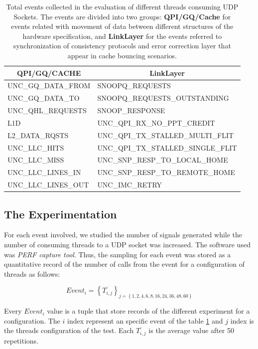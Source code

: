 \documentclass[journal]{IEEEtran}
\begin{document}
\begin{table}[h!]
\centering
\begin{tabular}{l|l}
\multicolumn{1}{c|}{{\bf QPI/GQ/CACHE}} & \multicolumn{1}{c}{{\bf LinkLayer}} \\ \hline
{ UNC\_GQ\_DATA\_FROM} & SNOOPQ\_REQUESTS \\
{ UNC\_GQ\_DATA\_TO} & SNOOPQ\_REQUESTS\_OUTSTANDING \\
{ UNC\_QHL\_REQUESTS} & SNOOP\_RESPONSE \\
{ L1D} & UNC\_QPI\_RX\_NO\_PPT\_CREDIT \\
{ L2\_DATA\_RQSTS} & UNC\_QPI\_TX\_STALLED\_MULTI\_FLIT \\
{ UNC\_LLC\_HITS} & UNC\_QPI\_TX\_STALLED\_SINGLE\_FLIT \\
{ UNC\_LLC\_MISS} & UNC\_SNP\_RESP\_TO\_LOCAL\_HOME \\
{ UNC\_LLC\_LINES\_IN} & UNC\_SNP\_RESP\_TO\_REMOTE\_HOME \\
{ UNC\_LLC\_LINES\_OUT} & UNC\_IMC\_RETRY
\end{tabular}
\caption{Total events collected in the evaluation of different threads consuming UDP Sockets. The events are divided into two groups: \textbf{QPI/GQ/Cache} for events related with movement of data between different structures of the hardware specification, and \textbf{LinkLayer} for the events referred to synchronization of consistency protocols and error correction layer that appear in cache bouncing scenarios.}
\label{table:eventos}
\end{table}


\subsection{The Experimentation}
For each event involved, we studied the number of signals generated while the number of consuming threads to a UDP socket was increased. The software used was \emph{PERF capture tool}. Thus, the sampling for each event was stored as a quantitative record of the number of calls from the event for a configuration of threads as follows:

$$Event_i=\left\{\overline{T_{i,j}}\right\}_{j=\left\{1,2,4,6,8,16,24,36,48,60\right\}}$$

Every $Event_i$ value is a tuple that store records of the different experiment for a configuration. The $i$ index represent an specific event of the table \ref{table:eventos} and $j$ index is the threads configuration of the test. Each $\overline{T_{i,j}}$ is the average value after 50 repetitions.
\end{document}
